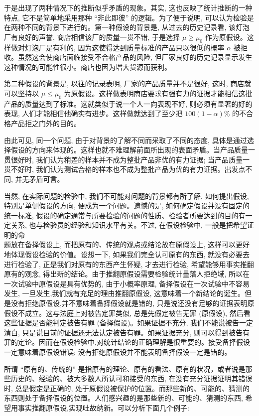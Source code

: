 \documentclass[10pt]{article}
\begin{document}
\begin{CJK*}{UTF8}{bsmi}
于是出现了两种情况下的推断似乎矛盾的现象。其实, 这也反映了统计推断的一种特点, 它不是简单地采用那种 “非此即彼” 的逻辑。为了便于说明, 可以认为检验是在两种不同的背景下进行的。第一种假设的背景是, 从过去的历史记录看, 该灯泡厂有良好的声誉, 商店相信该厂的质量一贯不错, 于是选择 $\mu \geqslant \mu_{0}$ 作为原假设。这样做对灯泡厂是有利的, 因为这使得达到质量标准的产品只以很低的概率 $\alpha$ 被拒收。虽然这会使商店面临接受不合格产品的风险, 但厂家良好的历史记录显示发生这种情况的可能性很小。商店也因为增大货源而获利。

第二种假设的背景是, 以往的记录表明, 厂家的产品质量并不是很好, 这时, 商店就可以坚持以 $\mu \leqslant \mu_{0}$ 为原假设。这样做表明商店要求有强有力的证据才能相信这批产品的质量达到了标准。这就类似于说一个人一向表现不好, 则必须有显著的好的表现, 人们才能相信他确实有进步。这样做就达到了至少把 $100(1-\alpha) \%$ 的不合格产品拒之门外的目的。

由此可见, 同一个问题, 由于对背景的了解不同而采取了不同的态度, 具体是通过选择假设的方向来体现的。这样也就不难理解前面所出现的表面矛盾。当产品质量一贯很好时, 我们认为稍差的样本并不成为整批产品非优的有力证据; 当产品质量一贯不好时, 我们认为测试合格的样本也不成为整批产品为优的有力证据。出发点不同, 并无矛盾可言。

当然, 在实际问题的检验中, 我们不可能对问题的背景都有所了解, 如何提出假设, 特别是单侧假设的方向, 便成为一个问题。遗憾的是, 如何确定假设并没有固定的统一标准, 假设的确定通常与所要检验的问题的性质、检验者所要达到的目的有一定关系, 也与检验员的经验和知识水平有关。不过, 在假设检验中, 一般是把希望证明的命\\
题放在备择假设上, 而把原有的、传统的观点或结论放在原假设上, 这样可以更好地体现假设检验的价值。设想一下, 如果我们完全认可原有的东西, 就没有必要去进行检验了, 正是我们对原有的东西产生怀疑, 才去进行检验, 希望能够用事实推翻原有的观念, 得出新的结论。由于推翻原假设需要检验统计量落人拒绝域, 所以在一次试验中原假设是具有优势的, 由于小概率原理, 备择假设在一次试验中不容易发生, 一旦发生,我们就有充足的理由推翻原假设, 这意味着一个新结论的诞生。但是没有拒绝原假设,并不意味着备择假设就是错的, 只是说还没有足够的证据表明原假设不成立。这与法庭上对被告定罪类似, 总是先假定被告无罪 (原假设), 然后看这些证据是否能判定被告有罪 (备择假设)。如果证据不充分, 我们不能说被告一定清白, 只是说目前的证据还无法认定被告有罪。如果证据充分, 则可以得到被告有罪的定论。因而在假设检验中,对统计结论的正确理解是很重要的。接受备择假设一定意味着原假设错误; 没有拒绝原假设并不能表明备择假设一定是错的。

所谓 “原有的、传统的” 是指原有的理论、原有的看法、原有的状况，或者说是那些历史的、经验的、被大多数人所认可和接受的东西, 在没有充分证据证明其错误时, 总是假定是正确的, 处于原假设被保护的位置。而那些新的、可能的、猜测的东西则处于备择假设的位置。人们感兴趣的是那些新的、可能的、猜测的东西, 希望用事实推翻原假设,实现吐故纳新。可以分析下面几个例子:


\end{CJK*}
\end{document}
